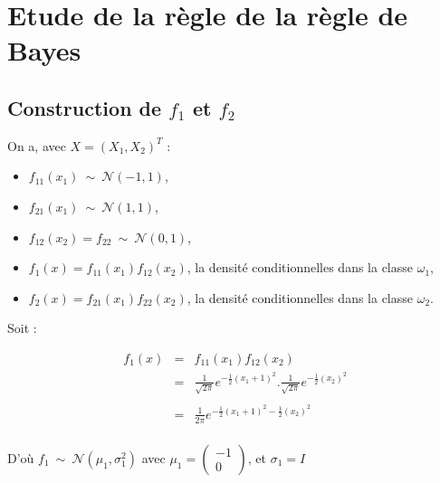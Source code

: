 \documentclass[a4paper,11pt]{article}
\begin{document}
\section{Etude de la règle de la règle de Bayes}

\subsection{Construction de $f_1$ et $f_2$}

\noindent On a, avec $X = (X_1,X_2)^T $ : \\
\begin{itemize} 
\item $f_{11} (x_1) \  \sim \ \mathcal{N}( -1, 1)$, \\
\item $f_{21} (x_1) \  \sim \ \mathcal{N}( 1, 1)$, \\
\item $f_{12} (x_2)  = f_{22} \  \sim \ \mathcal{N}( 0, 1)$, \\
\item $f_1 (x) = f_{11} (x_1) f_{12} (x_2)$, la densité conditionnelles dans la classe $\omega_1$, \\
\item $f_2 (x) = f_{21} (x_1) f_{22} (x_2)$, la densité conditionnelles dans la classe $\omega_2$. \\
\end{itemize}


\noindent Soit : 

 \begin{center}
   $$ 
   \begin{array}{rcl}
   f_1(x)   &=&  f_{11} (x_1) f_{12} (x_2) \\ 
   	   &=& \displaystyle  \frac{1}{\sqrt{2 \pi}} e^{-\frac{1}{2} (x_1 +1)^2}.  \frac{1}{\sqrt{2 \pi}} e^{-\frac{1}{2} (x_2)^2}\\ \\
	   &=& \displaystyle \frac{1}{2 \pi}    e^{-\frac{1}{2} (x_1 +1)^2 - \frac{1}{2} (x_2)^2} \\
	       \end{array}
   $$
\end{center}

\noindent D'où $f_1  \  \sim \ \mathcal{N}( \mu_1, \sigma_1^2)$ avec $\mu_1 =  \left (
   \begin{array}{ccc}
      -1 \\
      0
   \end{array}
   \right )$, et $\sigma_1 = I$ \\
   
\end{document}
